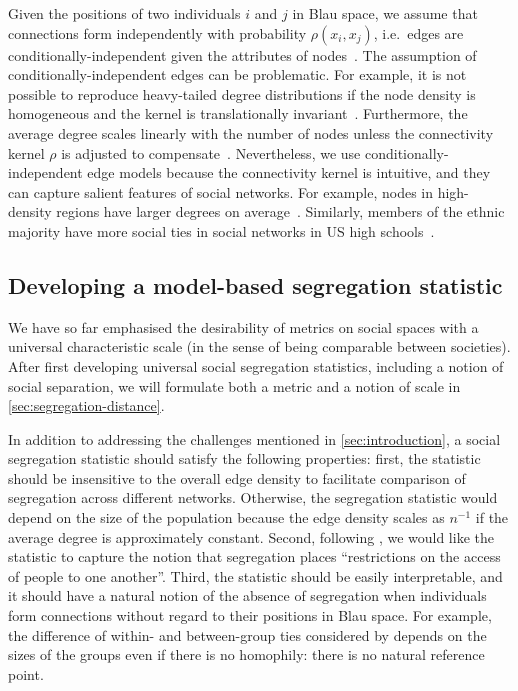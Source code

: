 \documentclass{scrartcl}
\begin{document}
\begin{refsection}
Given the positions of two individuals $i$ and $j$ in Blau space, we assume that connections form independently with probability $\rho(x_i, x_j)$, i.e.\ edges are conditionally-independent given the attributes of nodes~\cite{Fienberg2012}. The assumption of conditionally-in\-de\-pen\-dent edges can be problematic. For example, it is not possible to reproduce heavy-tailed degree distributions if the node density is homogeneous and the kernel is translationally invariant~\cite{Barnett2007}. Furthermore, the average degree scales linearly with the number of nodes unless the connectivity kernel $\rho$ is adjusted to compensate~\cite{Caron2017}. Nevertheless, we use conditionally-independent edge models because the connectivity kernel is intuitive, and they can capture salient features of social networks. For example, nodes in high-density regions have larger degrees on average~\cite{Barnett2007}. Similarly, members of the ethnic majority have more social ties in social networks in US high schools~\cite{Currarini2009}.

\subsection{Developing a model-based segregation statistic\label{sec:model-based-segregation}}

We have so far emphasised the desirability of metrics on social spaces with a universal characteristic scale (in the sense of being comparable between societies). After first developing universal social segregation statistics, including a notion of social separation, we will formulate both a metric and a notion of scale in \cref{sec:segregation-distance}.

In addition to addressing the challenges mentioned in \cref{sec:introduction}, a social segregation statistic should satisfy the following properties: first, the statistic should be insensitive to the overall edge density to facilitate comparison of segregation across different networks. Otherwise, the segregation statistic would depend on the size of the population because the edge density scales as $n^{-1}$ if the average degree is approximately constant. Second, following \textcite{Freeman1978}, we would like the statistic to capture the notion that segregation places ``restrictions on the access of people to one another''. Third, the statistic should be easily interpretable, and it should have a natural notion of the absence of segregation when individuals form connections without regard to their positions in Blau space. For example, the difference of within- and between-group ties considered by \textcite{Krackhardt1988} depends on the sizes of the groups even if there is no homophily: there is no natural reference point.


\end{refsection}
\end{document}
